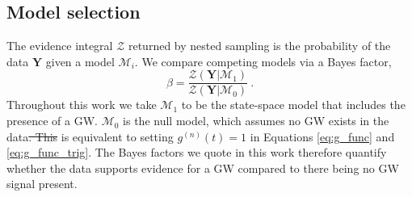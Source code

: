 \documentclass[fleqn,usenatbib,useAMS]{mnras}
\providecommand{\DIFadd}[1]{{\protect\color{blue}\uwave{#1}}} %
\providecommand{\DIFdel}[1]{{\protect\color{red}\sout{#1}}}                      %
\providecommand{\DIFaddbegin}{} %
\providecommand{\DIFaddend}{} %
\providecommand{\DIFdelbegin}{} %
\providecommand{\DIFdelend}{} %
\newcommand{\DIFscaledelfig}{0.5}
\newlength{\DIFdelgraphicswidth} %
\newlength{\DIFdelgraphicsheight} %
\newcommand{\DIFaddincludegraphics}[2][]{{\color{blue}\fbox{\DIFOincludegraphics[#1]{#2}}}} %
\newcommand{\DIFdelincludegraphics}[2][]{%
\sbox{\DIFdelgraphicsbox}{\DIFOincludegraphics[#1]{#2}}%
\settoboxwidth{\DIFdelgraphicswidth}{\DIFdelgraphicsbox} %
\settoboxtotalheight{\DIFdelgraphicsheight}{\DIFdelgraphicsbox} %
\scalebox{\DIFscaledelfig}{%
\parbox[b]{\DIFdelgraphicswidth}{\usebox{\DIFdelgraphicsbox}\\[-\baselineskip] \rule{\DIFdelgraphicswidth}{0em}}\llap{\resizebox{\DIFdelgraphicswidth}{\DIFdelgraphicsheight}{%
\setlength{\unitlength}{\DIFdelgraphicswidth}%
\begin{picture}(1,1)%
\thicklines\linethickness{2pt} %
{\color[rgb]{1,0,0}\put(0,0){\framebox(1,1){}}}%
{\color[rgb]{1,0,0}\put(0,0){\line( 1,1){1}}}%
{\color[rgb]{1,0,0}\put(0,1){\line(1,-1){1}}}%
\end{picture}%
}\hspace*{3pt}}} %
} %
\DeclareRobustCommand{\DIFaddbegin}{\DIFOaddbegin \let\includegraphics\DIFaddincludegraphics} %
\DeclareRobustCommand{\DIFaddend}{\DIFOaddend \let\includegraphics\DIFOincludegraphics} %
\DeclareRobustCommand{\DIFdelbegin}{\DIFOdelbegin \let\includegraphics\DIFdelincludegraphics} %
\DeclareRobustCommand{\DIFdelend}{\DIFOaddend \let\includegraphics\DIFOincludegraphics} %
\begin{document}

\subsection{Model selection}\label{sec:model_selection}
The evidence integral $\mathcal{Z}$ returned by nested sampling is the probability of the data $\boldsymbol{Y}$ given a model $\mathcal{M}_i$. We compare competing models via a Bayes factor,
\begin{equation}
	\beta = \frac{\mathcal{Z}(\boldsymbol{Y} | \mathcal{M}_1)}{\mathcal{Z}(\boldsymbol{Y} | \mathcal{M}_0)} \ . \label{eq:bayes}
\end{equation}
Throughout this work we take $\mathcal{M}_1$ to be the state-space model that includes the presence of a GW. $\mathcal{M}_0$ is the null model, which assumes no GW exists in the data\DIFdelbegin \DIFdel{. This }\DIFdelend \DIFaddbegin \DIFadd{, and }\DIFaddend is equivalent to setting $g^{(n)}(t)=1$ in Equations \eqref{eq:g_func} and \eqref{eq:g_func_trig}. The Bayes factors we quote in this work therefore quantify whether the data supports evidence for a GW \DIFaddbegin \DIFadd{signal }\DIFaddend compared to there being no GW signal present.
\end{document}
